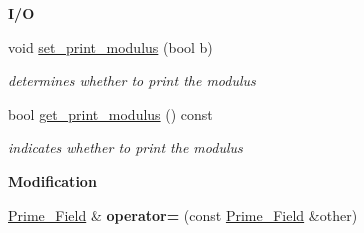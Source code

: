 \begin{Indent}\textbf{ I/O}\par
\begin{DoxyCompactItemize}
\item 
\mbox{\label{group___fields_group_a1ff3ec98ffb33a35c51eb3ce99ae7ebd}} 
void \hyperlink{group___fields_group_a1ff3ec98ffb33a35c51eb3ce99ae7ebd}{set\+\_\+print\+\_\+modulus} (bool b)
\begin{DoxyCompactList}\small\item\em determines whether to print the modulus \end{DoxyCompactList}\item 
\mbox{\label{group___fields_group_a5ac5cf31e741cc6d250176163bde658c}} 
bool \hyperlink{group___fields_group_a5ac5cf31e741cc6d250176163bde658c}{get\+\_\+print\+\_\+modulus} () const
\begin{DoxyCompactList}\small\item\em indicates whether to print the modulus \end{DoxyCompactList}\end{DoxyCompactItemize}
\end{Indent}
\begin{Indent}\textbf{ Modification}\par
\begin{DoxyCompactItemize}
\item 
\mbox{\label{group___fields_group_ae61b0c053fc94313ca06cbaf88068252}} 
\hyperlink{group___fields_group_class_prime___field}{Prime\+\_\+\+Field} \& {\bfseries operator=} (const \hyperlink{group___fields_group_class_prime___field}{Prime\+\_\+\+Field} \&other)
\end{DoxyCompactItemize}
\end{Indent}
